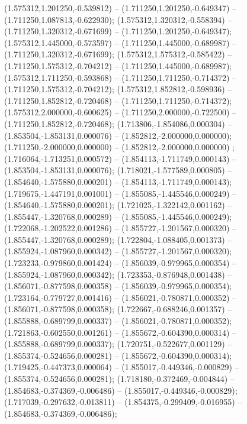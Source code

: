  (1.575312,1.201250,-0.539812) -- (1.711250,1.201250,-0.649347) -- (1.711250,1.087813,-0.622930);
 (1.575312,1.320312,-0.558394) -- (1.711250,1.320312,-0.671699) -- (1.711250,1.201250,-0.649347);
 (1.575312,1.445000,-0.573597) -- (1.711250,1.445000,-0.689987) -- (1.711250,1.320312,-0.671699);
 (1.575312,1.575312,-0.585422) -- (1.711250,1.575312,-0.704212) -- (1.711250,1.445000,-0.689987);
 (1.575312,1.711250,-0.593868) -- (1.711250,1.711250,-0.714372) -- (1.711250,1.575312,-0.704212);
 (1.575312,1.852812,-0.598936) -- (1.711250,1.852812,-0.720468) -- (1.711250,1.711250,-0.714372);
 (1.575312,2.000000,-0.600625) -- (1.711250,2.000000,-0.722500) -- (1.711250,1.852812,-0.720468);
 (1.713806,-1.854086,0.000304) -- (1.853504,-1.853131,0.000076) -- (1.852812,-2.000000,0.000000);
 (1.711250,-2.000000,0.000000) -- (1.852812,-2.000000,0.000000) ;
 (1.716064,-1.713251,0.000572) -- (1.854113,-1.711749,0.000143) -- (1.853504,-1.853131,0.000076);
 (1.718021,-1.577589,0.000805) -- (1.854640,-1.575880,0.000201) -- (1.854113,-1.711749,0.000143);
 (1.719675,-1.447191,0.001001) -- (1.855085,-1.445546,0.000249) -- (1.854640,-1.575880,0.000201);
 (1.721025,-1.322142,0.001162) -- (1.855447,-1.320768,0.000289) -- (1.855085,-1.445546,0.000249);
 (1.722068,-1.202522,0.001286) -- (1.855727,-1.201567,0.000320) -- (1.855447,-1.320768,0.000289);
 (1.722804,-1.088405,0.001373) -- (1.855924,-1.087960,0.000342) -- (1.855727,-1.201567,0.000320);
 (1.723233,-0.979860,0.001424) -- (1.856039,-0.979965,0.000354) -- (1.855924,-1.087960,0.000342);
 (1.723353,-0.876948,0.001438) -- (1.856071,-0.877598,0.000358) -- (1.856039,-0.979965,0.000354);
 (1.723164,-0.779727,0.001416) -- (1.856021,-0.780871,0.000352) -- (1.856071,-0.877598,0.000358);
 (1.722667,-0.688246,0.001357) -- (1.855888,-0.689799,0.000337) -- (1.856021,-0.780871,0.000352);
 (1.721863,-0.602550,0.001261) -- (1.855672,-0.604390,0.000314) -- (1.855888,-0.689799,0.000337);
 (1.720751,-0.522677,0.001129) -- (1.855374,-0.524656,0.000281) -- (1.855672,-0.604390,0.000314);
 (1.719425,-0.447373,0.000064) -- (1.855017,-0.449346,-0.000829) -- (1.855374,-0.524656,0.000281);
 (1.718180,-0.372469,-0.004844) -- (1.854683,-0.374369,-0.006486) -- (1.855017,-0.449346,-0.000829);
 (1.717039,-0.297632,-0.013811) -- (1.854375,-0.299409,-0.016955) -- (1.854683,-0.374369,-0.006486);
